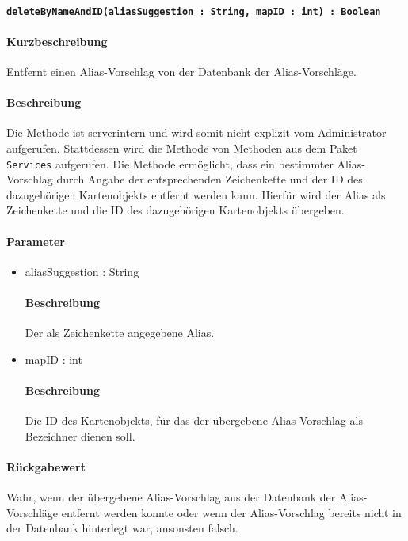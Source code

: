 \paragraph{\texttt{deleteByNameAndID(aliasSuggestion : String, mapID : int) : Boolean}}%
\paragraph*{Kurzbeschreibung}
Entfernt einen Alias-Vorschlag von der Datenbank der Alias-Vorschläge.
\paragraph*{Beschreibung}
Die Methode ist serverintern und wird somit nicht explizit vom Administrator aufgerufen.
Stattdessen wird die Methode von Methoden aus dem Paket \texttt{Services} aufgerufen.
Die Methode ermöglicht, dass ein bestimmter Alias-Vorschlag durch Angabe der entsprechenden Zeichenkette und der ID des dazugehörigen Kartenobjekts entfernt werden kann.
Hierfür wird der Alias als Zeichenkette und die ID des dazugehörigen Kartenobjekts übergeben.
\paragraph*{Parameter}
\begin{itemize}
    \item aliasSuggestion : String
    		\paragraph*{Beschreibung}
    		Der als Zeichenkette angegebene Alias.
    	\item mapID : int
    		\paragraph*{Beschreibung}
    		Die ID des Kartenobjekts, für das der übergebene Alias-Vorschlag als Bezeichner dienen soll.
\end{itemize}
\paragraph*{Rückgabewert}
Wahr, wenn der übergebene Alias-Vorschlag aus der Datenbank der Alias-Vorschläge entfernt werden konnte oder wenn der Alias-Vorschlag bereits nicht in der Datenbank hinterlegt war, ansonsten falsch.
